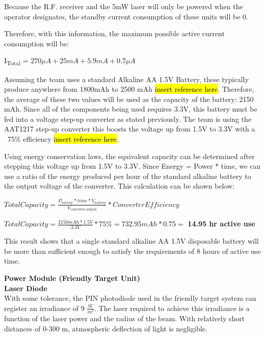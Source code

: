 \documentclass[letterpaper,10pt]{article}
\begin{document}
\begin{spacing}{1.15}
Because the R.F. receiver and the 5mW laser will only be powered when the operator designates, the standby current consumption of these units will be 0.

Therefore, with this information, the maximum possible active current consumption will be:
\begin{center}{I\textsubscript{Total} = $270 \mu A + 25 mA + 5.9 mA + 0.7 \mu A$}\end{center}

Assuming the team uses a standard Alkaline AA 1.5V Battery, these typically produce anywhere from 1800mAh to 2500 mAh \hl{insert reference here}. Therefore, the average of these two values will be used as the capacity of the battery: 2150 mAh. Since all of the components being used requires 3.3V, this battery must be fed into a voltage step-up converter as stated previously. The team is using the AAT1217 step-up converter this boosts the voltage up from 1.5V to 3.3V with a ~75\% efficiency \hl{insert reference here}.

Using energy conservation laws, the equivalent capacity can be determined after stepping this voltage up from 1.5V to 3.3V. Since Energy = Power * time, we can use a ratio of the energy produced per hour of the standard alkaline battery to the output voltage of the converter. This calculation can be shown below:

\begin{center} 
$Total Capacity = \frac{P_\textrm{battery}* time *  V_\textrm{battery}} {V_\textrm{converter-output}} * Converter Efficiency$

$ Total Capacity = \frac{2150 mAh *  1.5V} {3.3V} * 75\% = 732.95 mAh * 0.75 =$ \textbf{14.95 hr active use} 
\end{center}

This result shows that a single standard alkaline AA 1.5V disposable battery will be more than sufficient enough to satisfy the requirements of 8 hours of active use time.

\normalsize\textbf{Power Module (Friendly Target Unit)} \\

\normalsize\textbf{Laser Diode} \\
With some tolerance, the PIN photodiode used in the friendly target system can register an irradiance of 9 $\frac{W}{m^2}$. The laser required to achieve this irradiance is a function of the laser power and the radius of the beam. With relatively short distances of 0-300 m, atmospheric deflection of light is negligible. 


\end{spacing}
\end{document}
